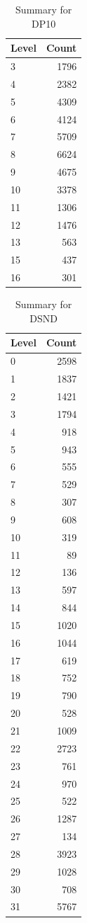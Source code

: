 \begin{table}[ht]
\centering
\begin{tabular}{lr}
  \hline
Level & Count \\ 
  \hline
3 & 1796 \\ 
  4 & 2382 \\ 
  5 & 4309 \\ 
  6 & 4124 \\ 
  7 & 5709 \\ 
  8 & 6624 \\ 
  9 & 4675 \\ 
  10 & 3378 \\ 
  11 & 1306 \\ 
  12 & 1476 \\ 
  13 & 563 \\ 
  15 & 437 \\ 
  16 & 301 \\ 
   \hline
\end{tabular}
\caption{Summary for DP10} 
\label{tab: DP10}
\end{table}
\begin{table}[ht]
\centering
\begin{tabular}{lr}
  \hline
Level & Count \\ 
  \hline
0 & 2598 \\ 
  1 & 1837 \\ 
  2 & 1421 \\ 
  3 & 1794 \\ 
  4 & 918 \\ 
  5 & 943 \\ 
  6 & 555 \\ 
  7 & 529 \\ 
  8 & 307 \\ 
  9 & 608 \\ 
  10 & 319 \\ 
  11 &  89 \\ 
  12 & 136 \\ 
  13 & 597 \\ 
  14 & 844 \\ 
  15 & 1020 \\ 
  16 & 1044 \\ 
  17 & 619 \\ 
  18 & 752 \\ 
  19 & 790 \\ 
  20 & 528 \\ 
  21 & 1009 \\ 
  22 & 2723 \\ 
  23 & 761 \\ 
  24 & 970 \\ 
  25 & 522 \\ 
  26 & 1287 \\ 
  27 & 134 \\ 
  28 & 3923 \\ 
  29 & 1028 \\ 
  30 & 708 \\ 
  31 & 5767 \\ 
   \hline
\end{tabular}
\caption{Summary for DSND} 
\label{tab: DSND}
\end{table}
